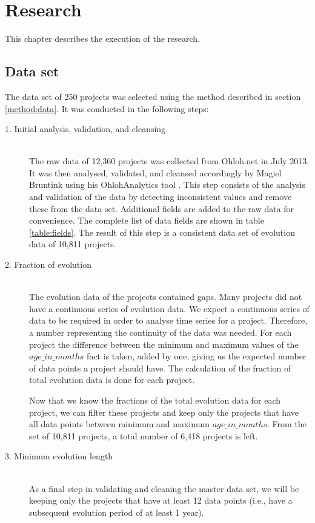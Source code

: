\chapter{Research}
\label{research}

This chapter describes the execution of the research.

\section{Data set}
The data set of 250 projects was selected using the method described in section
\ref{method:data}. It was conducted in the following steps:

\begin{description}
	\item[1. Initial analysis, validation, and cleansing] \hfill \\ The raw
	data of 12,360 projects was collected from Ohloh.net in July 2013. It was then
	analysed, validated, and cleansed accordingly by Magiel Bruntink using his
	OhlohAnalytics tool \cite{ohlohanalytics, bruntink2014}. This step consists
	of the analysis and validation of the data by detecting inconsistent values and
	remove these from the data set. Additional fields are added to the raw data for
	convenience. The complete list of data fields are shown in table
	\ref{table:fields}. The result of this step is a consistent data set of
	evolution data of 10,811 projects.

	\item[2. Fraction of evolution] \hfill \\ The evolution data of the
	projects contained gaps. Many projects did not have a continuous series of
	evolution data. We expect a continuous series of data to be required in order
	to analyse time series for a project. Therefore, a number representing the
	continuity of the data was needed. For each project the difference between the
	minimum and maximum values of the $age\_in\_months$ fact is taken, added by
	one, giving us the expected number of data points a project should have. The
	calculation of the fraction of total evolution data is done for each project.

	Now that we know the fractions of the total evolution data for each project, we
	can filter these projects and keep only the projects that have all data points
	between minimum and maximum $age\_in\_months$. From the set of 10,811
	projects, a total number of 6,418 projects is left.

	\item[3. Minimum evolution length] \hfill \\ As a final step in validating and
	cleaning the master data set, we will be keeping only the projects that have
	at least 12 data points (i.e., have a subsequent evolution period of at least 1
	year).


\end{description}
